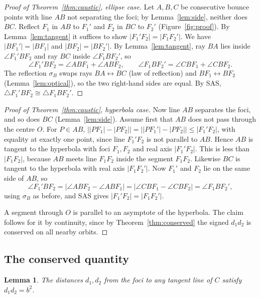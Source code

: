 \documentclass[11pt]{amsart}
\newtheorem{lemma}[theorem]{Lemma}
\theoremstyle{remark}
\begin{document}
\begin{proof}[Proof of Theorem~\ref{thm:caustic}, ellipse case]
Let $A, B, C$ be consecutive bounce points with line $AB$ not separating the
foci; by Lemma~\ref{lem:side}, neither does $BC$. Reflect $F_1$ in $AB$ to
$F_1'$ and $F_2$ in $BC$ to $F_2'$ (Figure~\ref{fig:proof}). By
Lemma~\ref{lem:tangent} it suffices to show $|F_1'F_2| = |F_1F_2'|$. We have
$|BF_1'| = |BF_1|$ and $|BF_2| = |BF_2'|$. By Lemma~\ref{lem:tangent}, ray $BA$
lies inside $\angle F_1'BF_2$ and ray $BC$ inside $\angle F_1BF_2'$, so
\[
  \angle F_1'BF_2 = \angle ABF_1 + \angle ABF_2, \qquad
  \angle F_1BF_2' = \angle CBF_1 + \angle CBF_2 .
\]
The reflection $\sigma_B$ swaps rays $BA \leftrightarrow BC$ (law of
reflection) and $BF_1 \leftrightarrow BF_2$ (Lemma~\ref{lem:optical}), so the
two right-hand sides are equal. By SAS,
$\triangle F_1'BF_2 \cong \triangle F_1BF_2'$.
\end{proof}

\begin{proof}[Proof of Theorem~\ref{thm:caustic}, hyperbola case]
Now line $AB$ separates the foci, and so does $BC$ (Lemma~\ref{lem:side}).
Assume first that $AB$ does not pass through the centre $O$. For
$P \in AB$, $\bigl||PF_1| - |PF_2|\bigr| = \bigl||PF_1'| - |PF_2|\bigr| \le |F_1'F_2|$,
with equality at exactly one point, since line $F_1'F_2$ is not parallel to
$AB$. Hence $AB$ is tangent to the hyperbola with foci $F_1, F_2$ and real axis
$|F_1'F_2|$. This is less than $|F_1F_2|$, because $AB$ meets line $F_1F_2$ inside the
segment $F_1F_2$. Likewise $BC$ is tangent to the hyperbola with real axis
$|F_1F_2'|$. Now $F_1'$ and $F_2$ lie on the same side of $AB$, so
\[
  \angle F_1'BF_2 = \bigl|\angle ABF_2 - \angle ABF_1\bigr|
  = \bigl|\angle CBF_1 - \angle CBF_2\bigr| = \angle F_1BF_2' ,
\]
using $\sigma_B$ as before, and SAS gives $|F_1'F_2| = |F_1F_2'|$.

A segment through $O$ is parallel to an asymptote of the hyperbola. The claim
follows for it by continuity, since by Theorem~\ref{thm:conserved} the
signed $d_1d_2$ is conserved on all nearby orbits.
\end{proof}

\subsection{The conserved quantity}

\begin{lemma}\label{lem:product}
The distances $d_1, d_2$ from the foci to any tangent line of $C$ satisfy
$d_1d_2 = b^2$.
\end{lemma}
\end{document}
